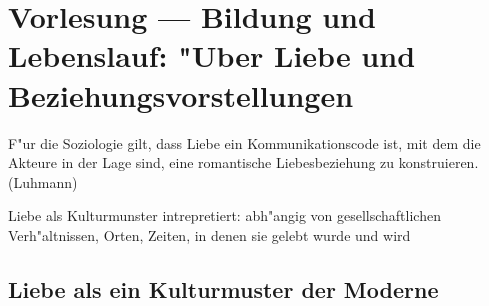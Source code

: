\section{Vorlesung  --- Bildung und Lebenslauf: "Uber Liebe und Beziehungsvorstellungen}

\begin{displayquote}
	F"ur die Soziologie gilt, dass Liebe ein Kommunikationscode ist, mit dem die Akteure in der Lage sind, eine romantische Liebesbeziehung zu konstruieren. (Luhmann)
\end{displayquote}
Liebe als Kulturmunster intrepretiert: abh"angig von gesellschaftlichen Verh"altnissen, Orten, Zeiten, in denen sie gelebt wurde und wird

\subsection{Liebe als ein Kulturmuster der Moderne}
